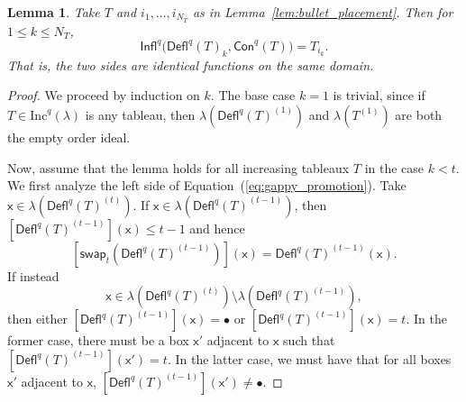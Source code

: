 \documentclass[12pt]{amsart}
\newcommand{\x}{\ensuremath{\mathsf{x}}}
\newtheorem{lemma}[theorem]{Lemma}
\theoremstyle{definition}
\theoremstyle{remark}
\numberwithin{equation}{section}
\renewcommand{\emptyset}{\varnothing}
\newcommand{\inc}{\ensuremath{\mathrm{Inc}}}
\newcommand{\swap}{\ensuremath{\mathsf{swap}}}
\newcommand{\rep}{\ensuremath{\mathsf{Rep}}}
\newcommand{\deflate}{\ensuremath{\mathsf{Defl}}}
\newcommand{\tinflate}{\ensuremath{\mathsf{Infl}}}
\newcommand{\content}{\ensuremath{\mathsf{Con}}}
\begin{document}
\begin{lemma} \label{lem:gappy_promotion}
Take $T$ and $i_1,...,i_{N_T}$ as in Lemma~\ref{lem:bullet_placement}. Then for $1 \leq k \leq N_T$, 
\begin{equation}\label{eq:gappy_promotion}
 \tinflate^q \Big( \deflate^q(T)_k, \content^q(T) \Big) = T_{i_k}. 
\end{equation}
 That is, the two sides are identical functions on the same domain. 
\end{lemma}

\begin{proof}  We proceed by induction on $k$. The base case $k=1$ is trivial, since if $T \in \inc^q(\lambda)$ is any tableau, then $\lambda \left( \deflate^q(T)^{(1)} \right)$ and $\lambda \left( T^{(1)} \right)$ are both the empty order ideal.

Now, assume that the lemma holds for all increasing tableaux $T$ in the case $k < t$. We first analyze the left side of Equation~(\ref{eq:gappy_promotion}). Take $\x \in \lambda\left( \deflate^q(T)^{(t)} \right)$. If $\x \in \lambda\left( \deflate^q(T)^{(t-1)} \right)$, then 
$[\deflate^q(T)^{(t-1)}](\x) \leq t-1$ and hence
\[
\left[ \swap_{t}(\deflate^q(T)^{(t-1)})\right](\x) = \deflate^q(T)^{(t-1)}(\x).
\]
 If instead
 \[\x \in \lambda\left(\deflate^q(T)^{(t)}\right) \setminus \lambda\left(\deflate^q(T)^{(t-1)}\right),\]
  then either $[\deflate^q(T)^{(t-1)}](\x) = \bullet$ or $[\deflate^q(T)^{(t-1)}](\x) = t$. In the former case, there must be a box $\x'$ adjacent to $\x$ such that $[\deflate^q(T)^{(t-1)}](\x') = t$. In the latter case, we must have that for all boxes $\x'$ adjacent to $\x$, $[\deflate^q(T)^{(t-1)}](\x') \neq \bullet$. 


\end{proof}
\end{document}
